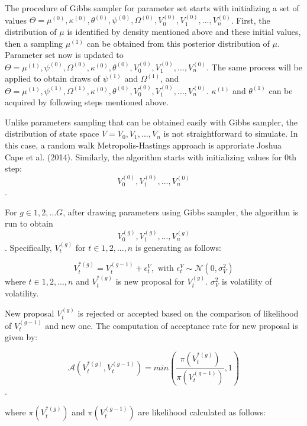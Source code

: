 \documentclass[12pt,a4paper]{article}
\numberwithin{equation}{section}
\begin{document}
The procedure of Gibbs sampler for parameter set starts with initializing a set of values $\Theta = { \mu^{(0)}, \kappa^{(0)}, \theta^{(0)}, \psi^{(0)}, \Omega^{(0)}, V_0^{(0)}, V_1^{(0)}, ..., V_n^{(0)} }$. First, the distribution of $\mu$ is identified by density mentioned above and these initial values, then a sampling $\mu^{(1)}$ can be obtained from this posterior distribution of $\mu$. Parameter set now is updated to $\Theta = { \mu^{(1)},\psi^{(0)}, \Omega^{(0)}, \kappa^{(0)}, \theta^{(0)}, V_0^{(0)}, V_1^{(0)}, ..., V_n^{(0)} }$. The same process will be applied to obtain draws of $\psi^{(1)}$ and $\Omega^{(1)}$, and  $\Theta = { \mu^{(1)},\psi^{(1)}, \Omega^{(1)}, \kappa^{(0)}, \theta^{(0)}, V_0^{(0)}, V_1^{(0)}, ..., V_n^{(0)} }$. $\kappa^{(1)}$ and $\theta^{(1)}$ can be acquired by following steps mentioned above. 

Unlike parameters sampling that can be obtained easily with Gibbs sampler, the distribution of state space $V = V_0, V_1, ..., V_n$ is not straightforward to simulate. In this case, a random walk Metropolis-Hastings approach is approriate Joshua Cape et al. (2014). Similarly, the algorithm starts with initializing values for 0th step:
\[V_0^{(0)}, V_1^{(0)}, ..., V_n^{(0)}\].

For $g \in {1, 2, ... G}$, after drawing parameters using Gibbs sampler, the algorithm is run to obtain \[V_0^{(g)}, V_1^{(g)}, ..., V_n^{(g)}\]. Specifically, $V_t^{(g)}$ for $t \in {1, 2, ..., n}$ is generating as follows:

\[V_t^{*(g)} = V_t^{(g-1)} + \epsilon_t^V, \text{ with } \epsilon_t^V \sim \mathcal{N}(0, \sigma_V^2)\]
where $t \in {1, 2, ..., n}$ and $V_t^{*(g)}$ is new proposal for $V_t^{(g)}$. $\sigma_V^2$ is volatility of volatility. 

New proposal $V_t^{(g)}$ is rejected or accepted based on the comparison of likelihood of $V_t^{(g-1)}$ and new one. The computation of acceptance rate for new proposal is given by:

\[\mathcal{A}(V_t^{*(g)}, V_t^{(g-1)}) = min \left( \frac{\pi(V_t^{*(g)})}{\pi(V_t^{(g-1)})}, 1 \right)\]. 

where $\pi(V_t^{*(g)})$ and $\pi(V_t^{(g-1)})$ are likelihood calculated as follows:
\end{document}
